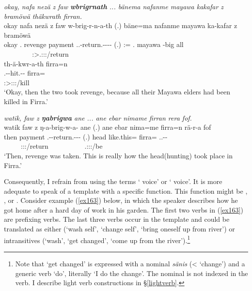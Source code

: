 \begin{exe}
	\ex
	\begin{xlist}
	\ex	\emph{okay, nafa nezä z faw \textbf{wbrigrnath} ... bänema nafanme mayawa kakafar z bramöwä thäkwrath firran.}\\
	\glll okay nafa nezä z faw w-brig-r-n-a-th (.) bäne=ma nafanme mayawa ka-kafar z bramöwä\\
	okay \Tnsg.\Erg{} revenge \Iam{} payment \Tsg.\F.\Alph-return.\Ext-\Lk-\Du-\Pst-\Stnsg{} (.) \Dem:\Med=\Char{} \Tnsg.\Poss{} mayawa \Redup-big \Iam{} all\\
	~ ~ ~ ~ ~ {\Stdu:\Sbj>\Tsg.\F:\Obj:\Pst:\Ipfv/return} ~ ~ ~ ~ ~ ~ ~\\
	\sn
	\glll th-ä-kwr-a-th firra=n\\
	\Stnsg.\Gam-\Vc\textbar\Ndu-hit.\Rs-\Pst-\Stnsg{} firra=\Loc\\
	\footnotesize{\Stpl:\Sbj>\Stpl:\Obj:\Pst:\Pfv/kill} ~\\
	\trans `Okay, then the two took revenge, because all their Mayawa elders had been killed in Firra.' 
	\label{ex159}

	\ex	\emph{watik, faw z \textbf{ŋabrigwa} ane ... ane ebar nimame firran rera fof.}\\
	\glll watik faw z ŋ-a-brig-w-a-\Zero{} ane (.) ane ebar{\fixgll} nima=me firra=n rä-r-a fof\\
	then payment \Iam{} \M.\Alph-\Vc-return.\Ext-\Ndu-\Pst-\Stsg{} \Dem{} (.) \Dem{} head like.this=\Ins{} firra=\Loc{} \Tsg.\F.\Cop-\Lk-\Pst{} \Emph\\
	~ ~ ~ {\Stsg:\Sbj:\Pst:\Ipfv/return} ~ ~ ~ ~ ~ ~ {\Tsg.\F:\Sbj:\Pst:\Ipfv/be} ~\\
	\trans `Then, revenge was taken. This is really how the head(hunting) took place in Firra.' 
	\label{ex329}
	\end{xlist}
\end{exe}

Consequently, I refrain from using the terms ` voice' or ` voice'. It is more adequate to speak of a  template with a specific function. This function might be , ,  or . Consider example (\ref{ex163}) below, in which the speaker describes how he got home after a hard day of work in his garden. The first two verbs in (\ref{ex163}) are prefixing verbs. The last three verbs occur in the  template and could be translated as either  (`wash self', `change self', `bring oneself up from river') or intransitives (`wash', `get changed', `come up from the river').\footnote{Note that `get changed' is expressed with a nominal \emph{sänis} (<  `change') and a generic verb `do', literally `I do the change'. The nominal is not indexed in the verb. I describe light verb constructions in \S\ref{lightverb}.}

